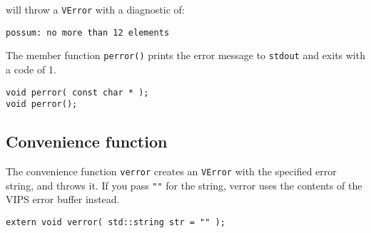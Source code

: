 \noindent
will throw a \verb+VError+ with a diagnostic of:

\begin{verbatim}
possum: no more than 12 elements
\end{verbatim}

The member function \verb+perror()+ prints the error message to \verb+stdout+
and exits with a code of 1.

\begin{verbatim}
void perror( const char * );
void perror();
\end{verbatim}

\subsection{Convenience function}

The convenience function \verb+verror+ creates an \verb+VError+ with the
specified error string, and throws it. If you pass \verb+""+ for the string,
verror uses the contents of the VIPS error buffer instead.

\begin{verbatim}
extern void verror( std::string str = "" );
\end{verbatim}

